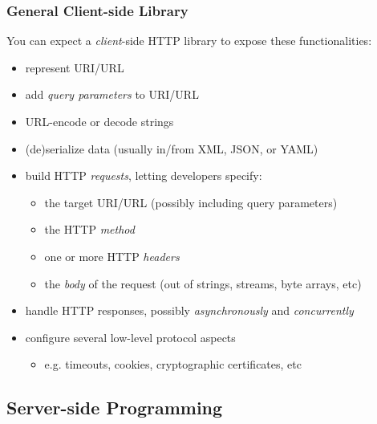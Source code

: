 \documentclass[presentation]{beamer}\mode<presentation>{\usetheme{AMSCesenaPurpleAndGold}}
\begin{document}
\begin{frame}%
\frametitle{General Client-side Library}

    You can expect a \emph{client}-side HTTP library to expose these functionalities:
    \begin{itemize}
        \item represent URI/URL
        
        \vfill

        \item add \emph{query parameters} to URI/URL
        
        \vfill

        \item URL-encode or decode strings
        
        \vfill

        \item (de)serialize data (usually in/from XML, \alert{JSON}, or YAML)
        
        \vfill

        \item build HTTP \emph{requests}, letting developers specify:
        \begin{itemize}
            \item the target URI/URL (possibly including query parameters)
            \item the HTTP \emph{method}
            \item one or more HTTP \emph{headers}
            \item the \emph{body} of the request (out of strings, streams, byte arrays, etc)
        \end{itemize}

        \vfill

        \item handle HTTP responses, possibly \emph{asynchronously} and \emph{concurrently}
        
        \vfill

        \item configure several low-level protocol aspects
        \begin{itemize}
            \item e.g. timeouts, cookies, cryptographic certificates, etc
        \end{itemize} 
    \end{itemize}
\end{frame}

\subsection{Server-side Programming}
\end{document}
